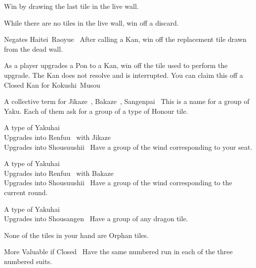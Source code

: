 	{}
	{Win by drawing the last tile in the live wall.}

	{}
	{While there are no tiles in the live wall, win off a discard.}

	{\symbnegate Negates Haitei~Raoyue~}
	{After calling a Kan, win off the replacement tile drawn from the dead wall.}

	{}
	{As a player upgrades a Pon to a Kan, win off the tile used to perform the upgrade. The Kan does not resolve and is interrupted. You can claim this off a Closed Kan for Kokushi~Musou~}

	{\upgradesto A collective term for Jikaze~, Bakaze~, Sangenpai~}
	{This is a name for a group of Yaku. Each of them ask for a group of a type of Honour tile.}

	{\upgradesfrom A type of Yakuhai~\\
	\upgradesto Upgrades into Renfuu~ with Jikaze~\\
	\upgradesto Upgrades into Shousuushii~}
	{Have a group of the wind corresponding to your seat.}

	{\upgradesfrom A type of Yakuhai~\\
	\upgradesto Upgrades into Renfuu~ with Bakaze~\\
	\upgradesto Upgrades into Shousuushii~}
	{Have a group of the wind corresponding to the current round.}

	{\upgradesfrom A type of Yakuhai~\\
	\upgradesto Upgrades into Shousangen~}
	{Have a group of any dragon tile.}

	{}
	{None of the tiles in your hand are Orphan tiles.}

	{\morevaluable More Valuable if Closed~}
	{Have the same numbered run in each of the three numbered suits.}

